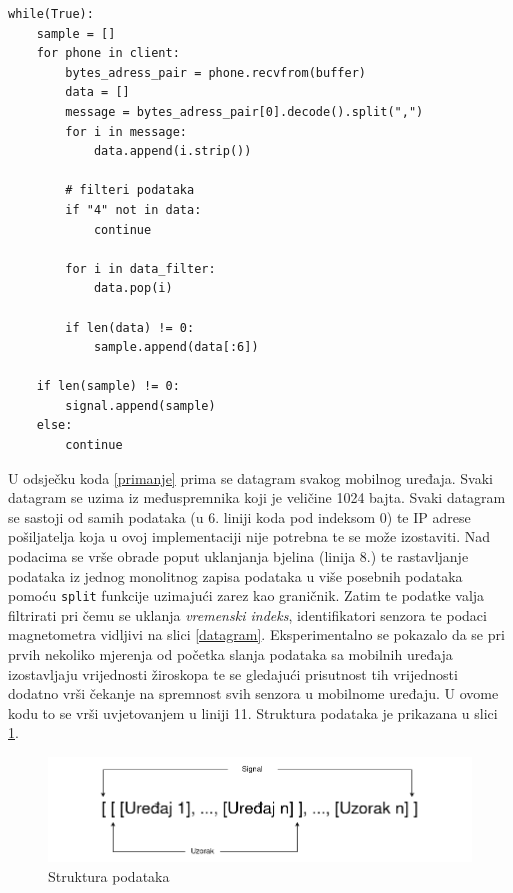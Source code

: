\documentclass[times, utf8, diplomski]{fer}
\begin{document}
\begin{lstlisting}[caption=Primanje podataka, label=primanje]
while(True):
    sample = []
    for phone in client:
        bytes_adress_pair = phone.recvfrom(buffer)
        data = []
        message = bytes_adress_pair[0].decode().split(",")
        for i in message:
            data.append(i.strip())

        # filteri podataka
        if "4" not in data:
            continue

        for i in data_filter:
            data.pop(i)
        
        if len(data) != 0:
            sample.append(data[:6])
            
    if len(sample) != 0:
        signal.append(sample)
    else:
        continue
\end{lstlisting}

U odsječku koda \ref{primanje} prima se datagram svakog mobilnog uređaja. Svaki datagram se uzima iz međuspremnika koji je veličine 1024 bajta. Svaki datagram se sastoji
od samih podataka (u 6. liniji koda pod indeksom 0) te IP adrese pošiljatelja koja u ovoj implementaciji nije potrebna te se može izostaviti. Nad podacima se vrše obrade
poput uklanjanja bjelina (linija 8.) te rastavljanje podataka iz jednog monolitnog zapisa podataka u više posebnih podataka pomoću \texttt{split} funkcije uzimajući
zarez kao graničnik. Zatim te podatke valja filtrirati pri čemu se uklanja \textit{vremenski indeks}, identifikatori senzora te podaci magnetometra
vidljivi na slici \ref{datagram}. Eksperimentalno se pokazalo da se pri prvih nekoliko mjerenja od početka slanja podataka sa mobilnih uređaja izostavljaju vrijednosti
žiroskopa te se gledajući prisutnost tih vrijednosti dodatno vrši čekanje na spremnost svih senzora u mobilnome uređaju. U ovome kodu to se vrši uvjetovanjem u liniji 11.
Struktura podataka je prikazana u slici \ref{struktura}.

\begin{figure}[h]
    \includegraphics[width=\textwidth]{OrganizacijaPOdataka.png}
    \caption{Struktura podataka}
    \label{struktura}
\end{figure}
\end{document}
